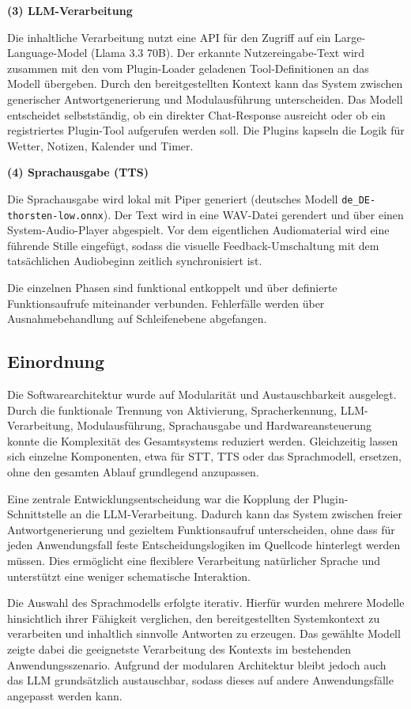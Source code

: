 \textbf{(3) LLM-Verarbeitung}

Die inhaltliche Verarbeitung nutzt eine API für den Zugriff auf ein Large-Language-Model (Llama 3.3 70B). 
Der erkannte Nutzereingabe-Text wird zusammen mit den vom Plugin-Loader geladenen Tool-Definitionen an das Modell übergeben. 
Durch den bereitgestellten Kontext kann das System zwischen generischer Antwortgenerierung und Modulausführung unterscheiden. 
Das Modell entscheidet selbstständig, ob ein direkter Chat-Response ausreicht oder ob ein registriertes Plugin-Tool aufgerufen werden soll. 
Die Plugins kapseln die Logik für Wetter, Notizen, Kalender und Timer.

\textbf{(4) Sprachausgabe (TTS)}

Die Sprachausgabe wird lokal mit Piper generiert (deutsches Modell \texttt{de\_DE-thorsten-low.onnx}). 
Der Text wird in eine WAV-Datei gerendert und über einen System-Audio-Player abgespielt. 
Vor dem eigentlichen Audiomaterial wird eine führende Stille eingefügt, sodass die visuelle Feedback-Umschaltung mit dem tatsächlichen Audiobeginn zeitlich synchronisiert ist.

Die einzelnen Phasen sind funktional entkoppelt und über definierte Funktionsaufrufe miteinander verbunden.
Fehlerfälle werden über Ausnahmebehandlung auf Schleifenebene abgefangen. 


\subsection{Einordnung}

Die Softwarearchitektur wurde auf Modularität und Austauschbarkeit ausgelegt. 
Durch die funktionale Trennung von Aktivierung, Spracherkennung, LLM-Verarbeitung, Modulausführung, Sprachausgabe und Hardwareansteuerung konnte die Komplexität des Gesamtsystems reduziert werden. 
Gleichzeitig lassen sich einzelne Komponenten, etwa für STT, TTS oder das Sprachmodell, ersetzen, ohne den gesamten Ablauf grundlegend anzupassen.

Eine zentrale Entwicklungsentscheidung war die Kopplung der Plugin-Schnittstelle an die LLM-Verarbeitung. 
Dadurch kann das System zwischen freier Antwortgenerierung und gezieltem Funktionsaufruf unterscheiden, ohne dass für jeden Anwendungsfall feste Entscheidungslogiken im Quellcode hinterlegt werden müssen. 
Dies ermöglicht eine flexiblere Verarbeitung natürlicher Sprache und unterstützt eine weniger schematische Interaktion.

Die Auswahl des Sprachmodells erfolgte iterativ. 
Hierfür wurden mehrere Modelle hinsichtlich ihrer Fähigkeit verglichen, den bereitgestellten Systemkontext zu verarbeiten und inhaltlich sinnvolle Antworten zu erzeugen. 
Das gewählte Modell zeigte dabei die geeignetste Verarbeitung des Kontexts im bestehenden Anwendungsszenario. 
Aufgrund der modularen Architektur bleibt jedoch auch das LLM grundsätzlich austauschbar, sodass dieses auf andere Anwendungsfälle angepasst werden kann.

